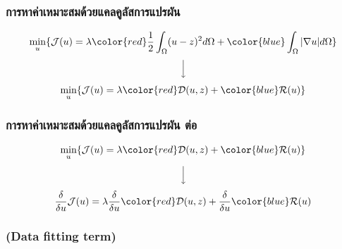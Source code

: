 \begin{frame}
    \frametitle{การหาค่าเหมาะสมด้วยแคลคูลัสการแปรผัน}
    \begin{align*}
        \min_{u} \{ \mathcal{J}(u) = \lambda {\color{red} \frac{1}{2} \int_{\Omega} (u-z)^2 d\Omega} +  {\color{blue}\int_{\Omega}  |\nabla u|  d\Omega} \}
    \end{align*}
        $$ \Big \downarrow$$
    \begin{align*}
        \min_{u} \{ \mathcal{J}(u) = \lambda {\color{red} \mathcal{D}(u,z)} +  {\color{blue} \mathcal{R}(u) } \}
    \end{align*}			
\end{frame}
\begin{frame}
    \frametitle{การหาค่าเหมาะสมด้วยแคลคูลัสการแปรผัน ต่อ}
    \begin{align*}
        \min_{u} \{ \mathcal{J}(u) = \lambda {\color{red} \mathcal{D}(u,z)} +  {\color{blue} \mathcal{R}(u) } \}
    \end{align*}
    $$ \Big \downarrow$$
    \begin{align*}
        \frac{\delta}{\delta u} \mathcal{J}(u) = \lambda   \frac{\delta}{\delta u} {\color{red} \mathcal{D}(u,z)} +    \frac{\delta}{\delta u} {\color{blue} \mathcal{R}(u) }
    \end{align*}
\end{frame}
\begin{frame}
    \frametitle{(Data fitting term)}
\end{frame}